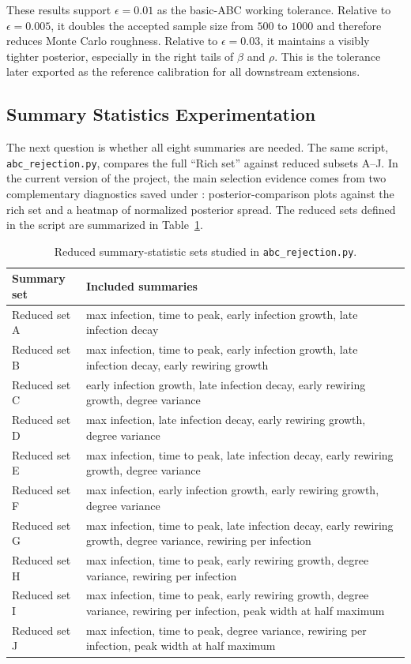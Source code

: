 \documentclass[11pt]{article}
\begin{document}
These results support $\epsilon=0.01$ as the basic-ABC working tolerance. Relative to $\epsilon=0.005$, it doubles the accepted sample size from $500$ to $1000$ and therefore reduces Monte Carlo roughness. Relative to $\epsilon=0.03$, it maintains a visibly tighter posterior, especially in the right tails of $\beta$ and $\rho$. This is the tolerance later exported as the reference calibration for all downstream extensions.

\subsection{Summary Statistics Experimentation}

The next question is whether all eight summaries are needed. The same script, \texttt{abc\_rejection.py}, compares the full ``Rich set'' against reduced subsets A--J. In the current version of the project, the main selection evidence comes from two complementary diagnostics saved under : posterior-comparison plots against the rich set and a heatmap of normalized posterior spread. The reduced sets defined in the script are summarized in Table~\ref{tab:reduced-sets}.

\begin{table}[H]
\centering
\caption{Reduced summary-statistic sets studied in \texttt{abc\_rejection.py}.}
\label{tab:reduced-sets}
\begin{tabular}{>{\raggedright\arraybackslash}p{} >{\raggedright\arraybackslash}p{}}
\toprule
Summary set & Included summaries \\
\midrule
Reduced set A & max infection, time to peak, early infection growth, late infection decay \\
Reduced set B & max infection, time to peak, early infection growth, late infection decay, early rewiring growth \\
Reduced set C & early infection growth, late infection decay, early rewiring growth, degree variance \\
Reduced set D & max infection, late infection decay, early rewiring growth, degree variance \\
Reduced set E & max infection, time to peak, late infection decay, early rewiring growth, degree variance \\
Reduced set F & max infection, early infection growth, early rewiring growth, degree variance \\
Reduced set G & max infection, time to peak, late infection decay, early rewiring growth, degree variance, rewiring per infection \\
Reduced set H & max infection, time to peak, early rewiring growth, degree variance, rewiring per infection \\
Reduced set I & max infection, time to peak, early rewiring growth, degree variance, rewiring per infection, peak width at half maximum \\
Reduced set J & max infection, time to peak, degree variance, rewiring per infection, peak width at half maximum \\
\bottomrule
\end{tabular}
\end{table}
\end{document}
